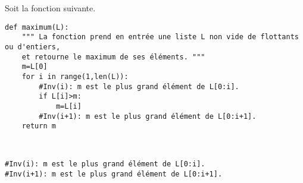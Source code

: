 Soit la fonction suivante.
\begin{lstlisting}
def maximum(L):
    """ La fonction prend en entrée une liste L non vide de flottants ou d'entiers,
    et retourne le maximum de ses éléments. """
    m=L[0]
    for i in range(1,len(L)):
        #Inv(i): m est le plus grand élément de L[0:i].
        if L[i]>m:
            m=L[i]
        #Inv(i+1): m est le plus grand élément de L[0:i+1].
    return m
\end{lstlisting}

\ifprof
\begin{corrige}~\\
\begin{lstlisting}
#Inv(i): m est le plus grand élément de L[0:i].
#Inv(i+1): m est le plus grand élément de L[0:i+1].
\end{lstlisting}
\end{corrige}
\else
\fi
